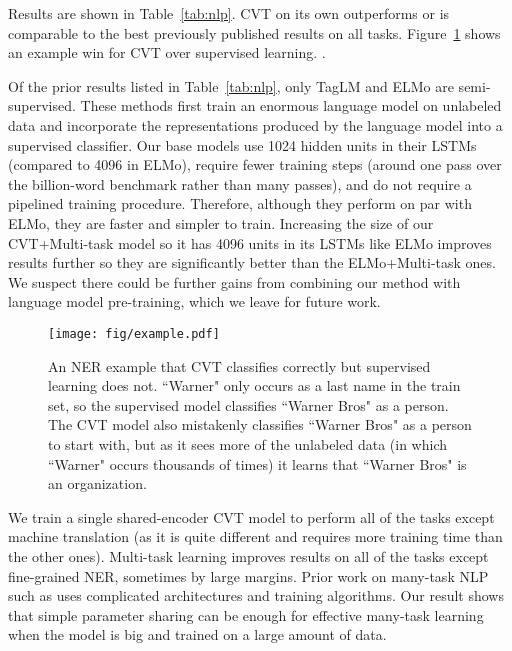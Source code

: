 \documentclass[11pt,a4paper]{article}
\newcommand{\xhdr}[1]{\vspace{1.7mm}\noindent{{\bf #1.}}}
\begin{document}
Results are shown in Table~\ref{tab:nlp}. 
CVT on its own outperforms or is comparable to the best previously published results on all tasks.
Figure~\ref{fig:example} shows an example win for CVT over supervised learning. .

Of the prior results listed in Table~\ref{tab:nlp}, only TagLM and ELMo are semi-supervised. These methods first train an enormous language model on unlabeled data and incorporate the representations produced by the language model into a supervised classifier.
Our base models use 1024 hidden units in their LSTMs (compared to 4096 in ELMo), require fewer training steps (around one pass over the billion-word benchmark rather than many passes), and do not require a pipelined training procedure.
Therefore, although they perform on par with ELMo, they are faster and simpler to train.
Increasing the size of our CVT+Multi-task model so it has 4096 units in its LSTMs like ELMo improves results further so they are significantly better than the ELMo+Multi-task ones.
We suspect there could be further gains from combining our method with language model pre-training, which we leave for future work.

\begin{figure}[t]
\texttt{[image: fig/example.pdf]}
\vspace{-3mm}
\caption{An NER example that CVT classifies correctly but supervised learning does not. ``Warner" only occurs as a last name in the train set, so the supervised model classifies ``Warner Bros" as a person. 
The CVT model also mistakenly classifies ``Warner Bros" as a person to start with, but as it sees more of the unlabeled data (in which ``Warner" occurs thousands of times) it learns that ``Warner Bros" is an organization.}
\label{fig:example}
\end{figure}


\xhdr{CVT + Multi-Task}
We train a single shared-encoder CVT model to perform all of the tasks except machine translation (as it is quite different and requires more training time than the other ones). 
Multi-task learning improves results on all of the tasks except fine-grained NER, sometimes by large margins. 
Prior work on many-task NLP such as \citet{hashimoto2016joint} uses complicated architectures and training algorithms.
Our result shows that simple parameter sharing can be enough for effective many-task learning when the model is big and trained on a large amount of data. 
\end{document}
